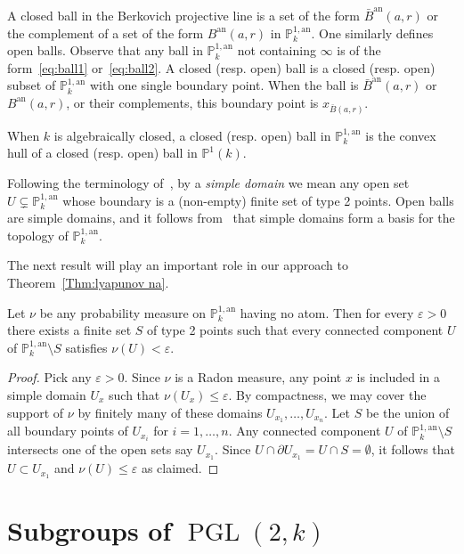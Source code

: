 \documentclass[10pt]{amsart}
\theoremstyle{definition}\newtheorem{defi}[theo]{Definition}\newtheorem{rema}[theo]{Remark}\newtheorem{exam}[theo]{Example}\newtheorem{exem}[theo]{Example}\newtheorem{nota}[theo]{Notation}
\DeclareMathOperator{\PGL}{PGL}
\newcommand{\an}{\mathrm{an}}
\newcommand{\e}{\varepsilon}
\newcommand{\PP}{\mathbb{P}}
\newcommand{\berk}{{\mathbb{P}^{1, \mathrm{an}}_k}}
\newcommand{\PGLk}{\PGL(2, k)}
\begin{document}
A closed ball in the Berkovich projective line is a set of the form $\bar B^\an(a, r)$ or the complement of a set of the form $B^\an(a, r) $ in $\PP^{1, \an}_k$. One similarly defines open balls. Observe that any ball in $\PP^{1, \an}_k$ not containing $\infty$ is of the form~\eqref{eq:ball1} or~\eqref{eq:ball2}. A closed (resp. open) ball is a closed (resp. open) subset of $\PP^{1, \an}_k$ with one single boundary point. When the ball is $\bar B^\an(a, r) $ or $B^\an(a, r)$, or their complements, this boundary point is $x_{\bar{B}(a,r)}$.

When $k$ is algebraically closed, a closed (resp. open) ball in $\PP^{1, \an}_k$ is the convex hull of a closed (resp. open) ball in $\PP^1(k)$.


Following the terminology of~\cite{baker-rumely}, by a \emph{simple domain} we mean any open set $U\subsetneq \berk$ whose boundary is a (non-empty) finite set of type 2 points. Open balls are simple domains, and it follows from~\cite[Thm.~4.2.1]{berko} that simple domains form a basis for the topology of $\berk$.

The next result will play an important role in our approach to Theorem~\ref{Thm:lyapunov na}.

\begin{prop}\label{prop:subtree Hk}
Let $\nu$ be any probability measure on $\berk$ having no atom. Then for every $\e>0$ there exists a finite set $S$ of type 2 points such that every connected component $U$ of $\berk\setminus S$ satisfies $\nu(U)<\e$.
\end{prop}

\begin{proof}
Pick any $\e>0$. Since $\nu$ is a Radon measure, any point $x$ is included in a simple domain $U_x$ such that $\nu(U_x) \le \e$. By compactness, we may cover the support of $\nu$ by finitely many of these domains $U_{x_1}, \ldots, U_{x_n}$. Let $S$ be the union of all boundary points of $U_{x_i}$ for $i =1, \ldots,n$. Any connected component $U$ of $\berk\setminus S$ intersects one of the open sets say $U_{x_1}$. Since $U \cap \partial U_{x_1} = U\cap S = \emptyset$, it follows that $U\subset U_{x_1}$ and $\nu(U) \le \e$ as claimed.
\end{proof}


\section{Subgroups of \texorpdfstring{$\PGLk$}{PGLk}}\label{sec:subgroups}
\end{document}
